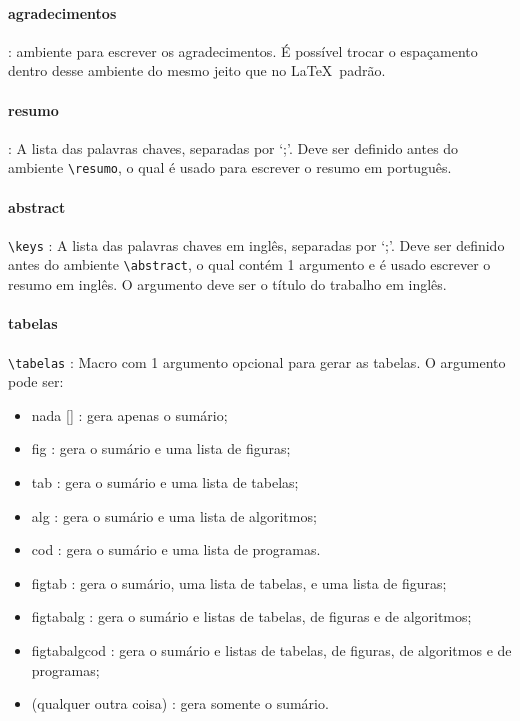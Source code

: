 \paragraph{agradecimentos\\}
\verb|| : ambiente para escrever os agradecimentos. É possível trocar o espaçamento dentro desse ambiente do mesmo jeito que no \LaTeX\ padrão.

\paragraph{resumo\\}
\verb|| : A lista das palavras chaves, separadas por `;'. Deve ser definido antes do ambiente \verb|\resumo|, o qual é usado para escrever o resumo em português.

\paragraph{abstract\\}
\verb|\keys| : A lista das palavras chaves em inglês, separadas por `;'. Deve ser definido antes do ambiente \verb|\abstract|, o qual contém 1 argumento e é usado escrever o resumo em inglês. O argumento deve ser o título do trabalho em inglês.

\paragraph{tabelas\\}
\verb|\tabelas| : Macro com 1 argumento opcional para gerar as tabelas. O argumento pode ser:
\begin{itemize}
 \item nada [] : gera apenas o sumário;
 \item \textsf{fig} : gera o sumário e uma lista de figuras;
 \item \textsf{tab} : gera o sumário e uma lista de tabelas;
 \item \textsf{alg} : gera o sumário e uma lista de algoritmos;
 \item \textsf{cod} : gera o sumário e uma lista de programas.
 \item \textsf{figtab} : gera o sumário, uma lista de tabelas, e uma lista de figuras;
 \item \textsf{figtabalg} : gera o sumário e listas de tabelas, de figuras e de algoritmos;
 \item \textsf{figtabalgcod} : gera o sumário e listas de tabelas, de figuras, de algoritmos e de programas;
 \item (qualquer outra coisa) : gera somente o sumário.
\end{itemize}

